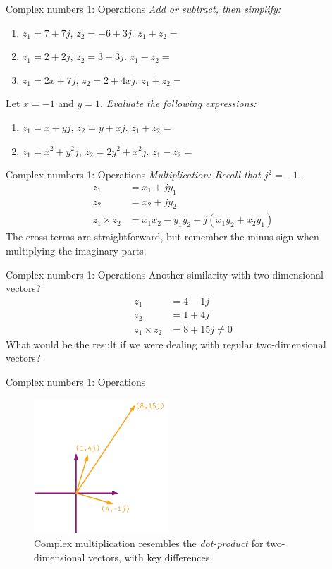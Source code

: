 \documentclass{beamer}
\begin{document}
\begin{frame}{Complex numbers 1: Operations}
\textit{Add or subtract, then simplify:}
\begin{enumerate}
\item $z_1 = 7+7j$, $z_2 = -6+3j$.  $z_1+z_2 = $
\item $z_1 = 2+2j$, $z_2 = 3-3j$.  $z_1-z_2 = $
\item $z_1 = 2x+7j$, $z_2 = 2+4xj$.  $z_1+z_2 = $
\end{enumerate}
Let $x=-1$ and $y=1$.  \textit{Evaluate the following expressions:}
\begin{enumerate}
\item $z_1 = x+yj$, $z_2 = y+xj$.  $z_1+z_2 = $
\item $z_1 = x^2+y^2j$, $z_2 = 2y^2+x^2j$.  $z_1-z_2 = $
\end{enumerate}
\end{frame}

\begin{frame}{Complex numbers 1: Operations}
\textit{Multiplication: Recall that $j^2 = -1$.}
\begin{align}
z_1 &= x_1+jy_1 \\
z_2 &= x_2 + j y_2 \\
z_1 \times z_2 &= x_1 x_2 - y_1 y_2 + j (x_1 y_2 + x_2 y_1)
\end{align}
The cross-terms are straightforward, but remember the minus sign when multiplying the imaginary parts.
\end{frame}

\begin{frame}{Complex numbers 1: Operations}
Another similarity with two-dimensional vectors?
\begin{align}
z_1 &= 4-1j \\
z_2 &= 1+4j \\
z_1 \times z_2 &= 8 + 15j \neq 0
\end{align}
What would be the result if we were dealing with regular two-dimensional vectors?
\end{frame}

\begin{frame}{Complex numbers 1: Operations}
\begin{figure}
\centering
\includegraphics[width=0.45\textwidth]{figures/complexNumbers3.pdf}
\caption{\label{fig:complex2} Complex multiplication resembles the \textit{dot-product} for two-dimensional vectors, with key differences.}
\end{figure}
\end{frame}
\end{document}
